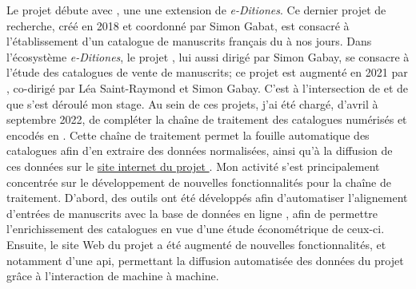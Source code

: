 Le projet débute avec \ktb{}, une une extension de \textit{e-Ditiones}. Ce dernier projet de recherche, créé en 2018 et coordonné par Simon Gabat, est consacré à l'établissement d'un catalogue de manuscrits français du  à nos jours. Dans l'écosystème \textit{e-Ditiones}, le projet \ktb{}, lui aussi dirigé par Simon Gabay, se consacre à l'étude des catalogues de vente de manuscrits; ce projet est augmenté en 2021 par \mss{}, co-dirigé par Léa Saint-Raymond et Simon Gabay. C'est à l'intersection de \mss{} et de \ktb{} que s'est déroulé mon stage. Au sein de ces projets, j'ai été chargé, d'avril à septembre 2022, de compléter la chaîne de traitement des catalogues numérisés et encodés en \xmltei{}. Cette chaîne de traitement permet la fouille automatique des catalogues afin d'en extraire des données normalisées, ainsi qu'à la diffusion de ces données sur le \href{https://katabase.huma-num.fr/}{site internet du projet \ktb{}}. Mon activité s'est principalement concentrée sur le développement de nouvelles fonctionnalités pour la chaîne de traitement. D'abord, des outils ont été développés afin d'automatiser l'alignement d'entrées de manuscrits avec la base de données en ligne \wkd{}, afin de permettre l'enrichissement des catalogues en vue d'une étude économétrique de ceux-ci. Ensuite, le site Web du projet a été augmenté de nouvelles fonctionnalités, et notamment d'une \gls{api}, permettant la diffusion automatisée des données du projet grâce à l'interaction de machine à machine.

